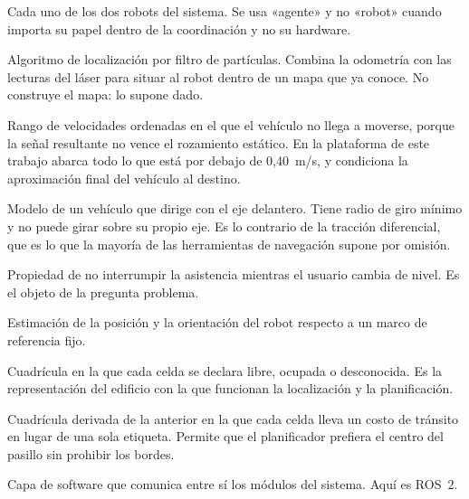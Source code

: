 \begin{description}[style=nextline,leftmargin=1.5em,itemsep=0.2em]
  \item[Agente] Cada uno de los dos robots del sistema. Se usa «agente» y no
    «robot» cuando importa su papel dentro de la coordinación y no su hardware.

  \item[AMCL] Algoritmo de localización por filtro de partículas. Combina la
    odometría con las lecturas del láser para situar al robot dentro de un mapa
    que ya conoce. No construye el mapa: lo supone dado.

  \item[Banda muerta de tracción] Rango de velocidades ordenadas en el que el
    vehículo no llega a moverse, porque la señal resultante no vence el
    rozamiento estático. En la plataforma de este trabajo abarca todo lo que
    está por debajo de 0,40~m/s, y condiciona la aproximación final del vehículo
    al destino.

  \item[Cinemática tipo automóvil (dirección Ackermann)] Modelo de un vehículo
    que dirige con el eje delantero. Tiene radio de giro mínimo y no puede girar
    sobre su propio eje. Es lo contrario de la tracción diferencial, que es lo
    que la mayoría de las herramientas de navegación supone por omisión.

  \item[Continuidad del servicio] Propiedad de no interrumpir la asistencia
    mientras el usuario cambia de nivel. Es el objeto de la pregunta problema.

  \item[Localización] Estimación de la posición y la orientación del robot
    respecto a un marco de referencia fijo.

  \item[Mapa de ocupación] Cuadrícula en la que cada celda se declara libre,
    ocupada o desconocida. Es la representación del edificio con la que
    funcionan la localización y la planificación.

  \item[Mapa de costos (\textit{costmap})] Cuadrícula derivada de la anterior en
    la que cada celda lleva un costo de tránsito en lugar de una sola etiqueta.
    Permite que el planificador prefiera el centro del pasillo sin prohibir
    los bordes.

  \item[Middleware robótico] Capa de software que comunica entre sí los módulos
    del sistema. Aquí es ROS~2.


\end{description}
